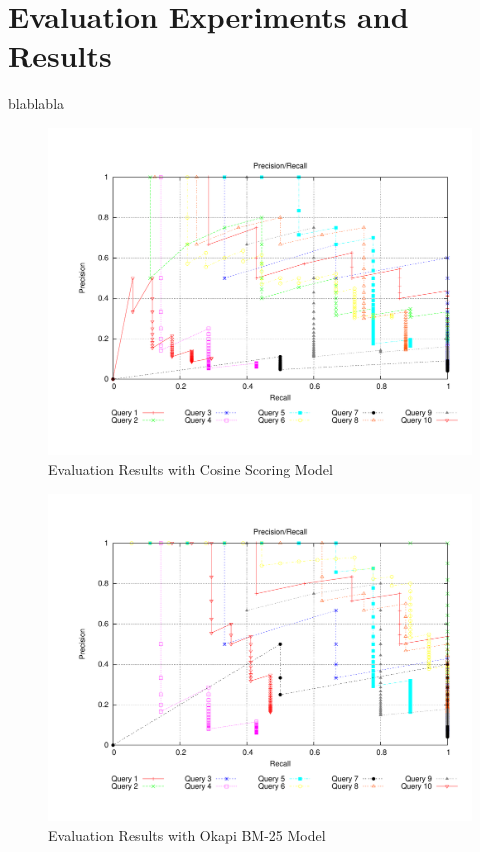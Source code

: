 \chapter{Evaluation Experiments and Results}
\label{sec:results}
\thispagestyle{fancy}
blablabla

\begin{figure}
\includegraphics[width=1.0\textwidth]{include/bench_cosine}
\caption{Evaluation Results with Cosine Scoring Model}
\label{fig:cosine}
\end{figure}

\begin{figure}
\includegraphics[width=1.0\textwidth]{include/bench_okapi}
\caption{Evaluation Results with Okapi BM-25 Model}
\label{fig:cosine}
\end{figure}